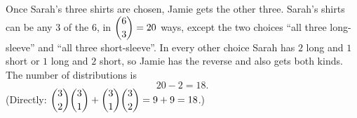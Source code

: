 Once Sarah's three shirts are chosen, Jamie gets the other three. Sarah's shirts can be any $3$ of the $6$, in $\dbinom63=20$ ways, except the two choices ``all three long-sleeve'' and ``all three short-sleeve''. In every other choice Sarah has $2$ long and $1$ short or $1$ long and $2$ short, so Jamie has the reverse and also gets both kinds. The number of distributions is
\[20-2=\boxed{18}.\]
(Directly: $\dbinom32\dbinom31+\dbinom31\dbinom32=9+9=18$.)
